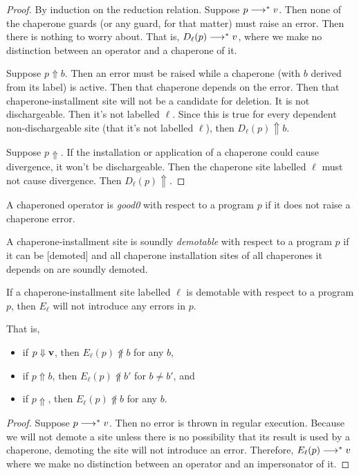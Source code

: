 \begin{proof}
By induction on the reduction relation.
Suppose $p\longrightarrow^{*} v$.
Then none of the chaperone guards (or any guard, for that matter) must raise an error.
Then there is nothing to worry about.
That is, $D_\ell(p)\longrightarrow^{*} v$, where we make no distinction between an operator and a chaperone of it.

Suppose $p\Uparrow b$. 
Then an error must be raised while a chaperone (with $b$ derived from its label) is active.
Then that chaperone depends on the error.
Then that chaperone-installment site will not be a candidate for deletion.
It is not dischargeable.
Then it's not labelled $\ell$.
Since this is true for every dependent non-dischargeable site (that it's not labelled $\ell$), then $D_\ell(p)\Uparrow b$.

Suppose $p\Uparrow$.
If the installation or application of a chaperone could cause divergence, it won't be dischargeable.
Then the chaperone site labelled $\ell$ must not cause divergence.
Then $D_\ell(p)\Uparrow$.
\end{proof}

\begin{definition}
A chaperoned operator is \emph{good0} with respect to a program $p$ if it does not raise a chaperone error.
\end{definition}

\begin{definition}
A chaperone-installment site is soundly \emph{demotable} with respect to a program $p$ if it can be [demoted] and all chaperone installation sites of all chaperones it depends on are soundly demoted.
\end{definition}

\begin{lemma}
If a chaperone-installment site labelled $\ell$ is demotable with respect to a program $p$, then $E_\ell$ will not introduce any errors in $p$.

That is,
\begin{itemize}
\item if $p\Downarrow\mathbf{v}$, then $E_\ell(p)\not\Uparrow b$ for any $b$,
\item if $p\Uparrow b$, then $E_\ell(p)\not\Uparrow b'$ for $b\ne b'$, and
\item if $p\Uparrow$, then $E_\ell(p)\not\Uparrow b$ for any $b$.
\end{itemize}
\end{lemma}

\begin{proof}
Suppose $p\longrightarrow^{*} v$.
Then no error is thrown in regular execution.
Because we will not demote a site unless there is no possibility that its result is used by a chaperone, demoting the site will not introduce an error.
Therefore, $E_\ell(p)\longrightarrow^{*} v$ where we make no distinction between an operator and an impersonator of it.

\end{proof}

